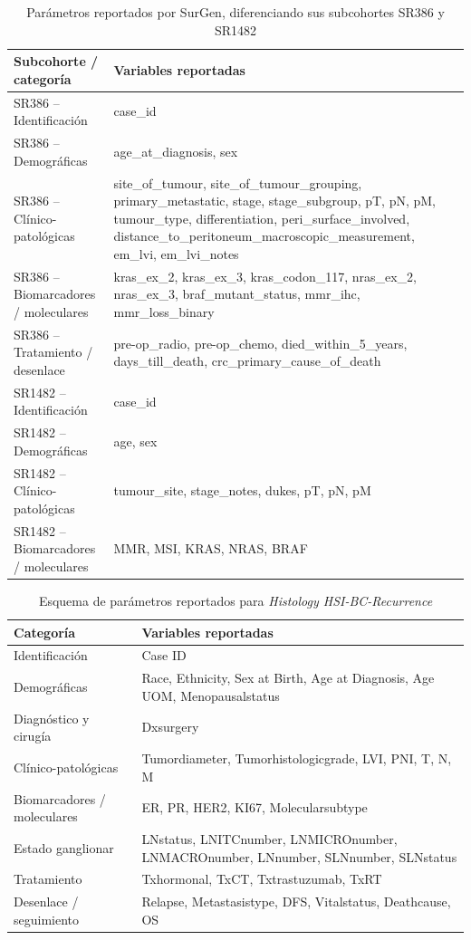 \begin{table}[ht]
\centering
\caption{Parámetros reportados por SurGen, diferenciando sus subcohortes SR386 y SR1482}
\label{tab:parametros_surgen}
\renewcommand{\arraystretch}{1.2}
\begin{tabularx}{\textwidth}{lX}
\toprule
\textbf{Subcohorte / categoría} & \textbf{Variables reportadas} \\
\midrule
SR386 -- Identificación & case\_id \\
SR386 -- Demográficas & age\_at\_diagnosis, sex \\
SR386 -- Clínico-patológicas & site\_of\_tumour, site\_of\_tumour\_grouping, primary\_metastatic, stage, stage\_subgroup, pT, pN, pM, tumour\_type, differentiation, peri\_surface\_involved, distance\_to\_peritoneum\_macroscopic\_measurement, em\_lvi, em\_lvi\_notes \\
SR386 -- Biomarcadores / moleculares & kras\_ex\_2, kras\_ex\_3, kras\_codon\_117, nras\_ex\_2, nras\_ex\_3, braf\_mutant\_status, mmr\_ihc, mmr\_loss\_binary \\
SR386 -- Tratamiento / desenlace & pre-op\_radio, pre-op\_chemo, died\_within\_5\_years, days\_till\_death, crc\_primary\_cause\_of\_death \\
\midrule
SR1482 -- Identificación & case\_id \\
SR1482 -- Demográficas & age, sex \\
SR1482 -- Clínico-patológicas & tumour\_site, stage\_notes, dukes, pT, pN, pM \\
SR1482 -- Biomarcadores / moleculares & MMR, MSI, KRAS, NRAS, BRAF \\
\bottomrule
\end{tabularx}
\end{table}

\begin{table}[ht]
\centering
\caption{Esquema de parámetros reportados para \textit{Histology HSI-BC-Recurrence}}
\label{tab:parametros_hsibrca}
\renewcommand{\arraystretch}{1.2}
\begin{tabularx}{\textwidth}{lX}
\toprule
\textbf{Categoría} & \textbf{Variables reportadas} \\
\midrule
Identificación & Case ID \\
Demográficas & Race, Ethnicity, Sex at Birth, Age at Diagnosis, Age UOM, Menopausalstatus \\
Diagnóstico y cirugía & Dxsurgery \\
Clínico-patológicas & Tumordiameter, Tumorhistologicgrade, LVI, PNI, T, N, M \\
Biomarcadores / moleculares & ER, PR, HER2, KI67, Molecularsubtype \\
Estado ganglionar & LNstatus, LNITCnumber, LNMICROnumber, LNMACROnumber, LNnumber, SLNnumber, SLNstatus \\
Tratamiento & Txhormonal, TxCT, Txtrastuzumab, TxRT \\
Desenlace / seguimiento & Relapse, Metastasistype, DFS, Vitalstatus, Deathcause, OS \\
\bottomrule
\end{tabularx}
\end{table}

